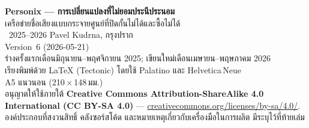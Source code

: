 \thispagestyle{empty}
\ifdefined\printmode\vspace*{\fill}\else{}\fi
\begin{flushleft}\small\sffamily
\textbf{Personix --- การเปลี่ยนแปลงที่ไม่ยอมประนีประนอม}\\[0.3em]
เครือข่ายชื่อเสียงแบบกระจายศูนย์ที่ปิดกั้นไม่ได้และซื้อไม่ได้\\[1.4em]

\textcopyright\ 2025--2026 Pavel Kudrna, กรุงปราก\\[0.4em]

Version~6 (2026-05-21)\\
ร่างครั้งแรกเดือนมิถุนายน--พฤศจิกายน 2025; เขียนใหม่เดือนเมษายน--พฤษภาคม 2026\\[1.4em]

เรียงพิมพ์ด้วย \LaTeX{} (Tectonic) โดยใช้ Palatino และ Helvetica\,Neue\\
A5 แนวนอน (210\,$\times$\,148\,มม.)\\[1.4em]

อนุญาตให้ใช้ภายใต้ \textbf{Creative Commons Attribution-ShareAlike 4.0
International (CC BY-SA 4.0)} ---
\href{https://creativecommons.org/licenses/by-sa/4.0/}{creativecommons.org/licenses/by-sa/4.0/}.
องค์ประกอบที่สงวนสิทธิ์ คลังซอร์สโค้ด และหมายเหตุเกี่ยวกับเครื่องมือในการผลิต
มีระบุไว้ที่ท้ายเล่ม
\end{flushleft}
\ifdefined\printmode\else{}\fi
\clearpage
